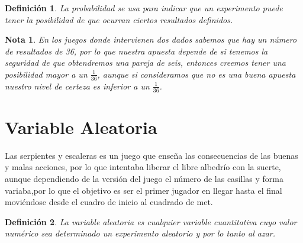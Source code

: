 \documentclass[12pt]{article}
\newtheorem{Def}{\quad Definición}
\newtheorem{Note}{\quad Nota}
\begin{document}
\begin{Def} 
La probabilidad se usa para indicar que un  experimento puede tener la posibilidad de que ocurran ciertos resultados definidos.
\end{Def}

\begin{Note} 
En los juegos donde intervienen dos dados sabemos que hay un número de resultados de 36, por lo que nuestra apuesta depende de si tenemos la seguridad de que obtendremos una pareja de seis, entonces creemos tener una posibilidad mayor a un $\frac{1}{36}$, aunque si consideramos que no es una buena apuesta nuestro nivel de certeza es inferior a un $\frac{1}{36}$. 
\end{Note}



\section{Variable Aleatoria}

Las serpientes y escaleras es un juego que enseña las consecuencias de las buenas y malas acciones, por lo que  intentaba liberar el libre albedrío con la suerte, aunque dependiendo de la versión del juego el número de las casillas y forma  variaba,por lo que el objetivo es ser el primer jugador en llegar hasta el final moviéndose desde el cuadro de inicio al cuadrado de met.

\begin{Def} 
La variable aleatoria  es cualquier variable cuantitativa cuyo valor numérico sea determinado un experimento aleatorio y por lo tanto al azar.
\end{Def}


\end{document}
